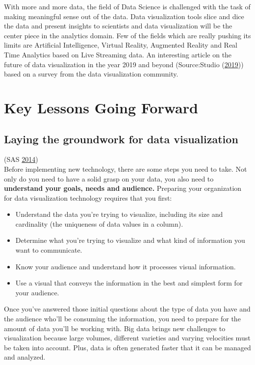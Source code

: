 \documentclass[]{book}
\providecommand{\tightlist}{%
  \setlength{\itemsep}{0pt}\setlength{\parskip}{0pt}}
\begin{document}
With more and more data, the field of Data Science is challenged with the task of making meaningful sense out of the data. Data visualization tools slice and dice the data and present insights to scientists and data visualization will be the center piece in the analytics domain. Few of the fields which are really pushing its limits are Artificial Intelligence, Virtual Reality, Augmented Reality and Real Time Analytics based on Live Streaming data. An interesting article on the future of data visualization in the year 2019 and beyond (Source:Studio (\protect\hyperlink{ref-depictdatastudio}{2019})) based on a survey from the data visualization community.

\hypertarget{key-lessons-going-forward}{%
\section{Key Lessons Going Forward}\label{key-lessons-going-forward}}

\hypertarget{laying-the-groundwork-for-data-visualization}{%
\subsection{Laying the groundwork for data visualization}\label{laying-the-groundwork-for-data-visualization}}

(SAS \protect\hyperlink{ref-why_dataviz_matters}{2014})\\
Before implementing new technology, there are some steps you need to take. Not only do you need to have a solid grasp on your data, you also need to \textbf{understand your goals, needs and audience.} Preparing your organization for data visualization technology requires that you first:

\begin{itemize}
\tightlist
\item
  Understand the data you're trying to visualize, including its size and cardinality (the uniqueness of data values in a column).
\item
  Determine what you're trying to visualize and what kind of information you want to communicate.
\item
  Know your audience and understand how it processes visual information.
\item
  Use a visual that conveys the information in the best and simplest form for your audience.
\end{itemize}

Once you've answered those initial questions about the type of data you have and the audience who'll be consuming the information, you need to prepare for the amount of data you'll be working with. Big data brings new challenges to visualization because large volumes, different varieties and varying velocities must be taken into account. Plus, data is often generated faster that it can be managed and analyzed.
\end{document}
